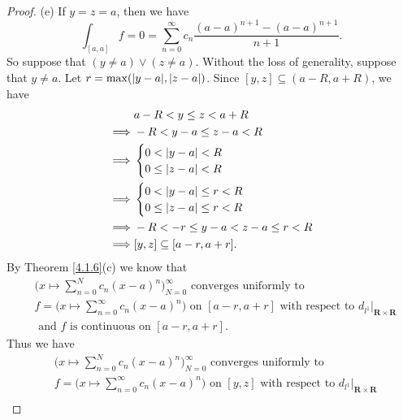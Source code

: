 \begin{proof}{(e)}
    If \(y = z = a\), then we have
    \[
        \int_{[a, a]} f = 0 = \sum_{n = 0}^\infty c_n \frac{(a - a)^{n + 1} - (a - a)^{n + 1}}{n + 1}.
    \]
    So suppose that \((y \neq a) \lor (z \neq a)\).
    Without the loss of generality, suppose that \(y \neq a\).
    Let \(r = \max(\abs*{y - a}, \abs*{z - a})\).
    Since \([y, z] \subseteq (a - R, a + R)\), we have
    \begin{align*}
                 & a - R < y \leq z < a + R              \\
        \implies & -R < y - a \leq z - a < R             \\
        \implies & \begin{cases}
            0 < \abs*{y - a} < R \\
            0 \leq \abs*{z - a} < R
        \end{cases}            \\
        \implies & \begin{cases}
            0 < \abs*{y - a} \leq r < R \\
            0 \leq \abs*{z - a} \leq r < R
        \end{cases}            \\
        \implies & -R < -r \leq y - a < z - a \leq r < R \\
        \implies & [y, z] \subseteq [a - r, a + r].
    \end{align*}
    By Theorem \ref{4.1.6}(c) we know that
    \begin{align*}
         & \bigg(x \mapsto \sum_{n = 0}^N c_n (x - a)^n\bigg)_{N = 0}^\infty \text{ converges uniformly to }                                                       \\
         & f = \bigg(x \mapsto \sum_{n = 0}^\infty c_n (x - a)^n\bigg) \text{ on } [a - r, a + r] \text{ with respect to } d_{l^1}|_{\mathbf{R} \times \mathbf{R}} \\
         & \text{ and } f \text{ is continuous on } [a - r, a + r].
    \end{align*}
    Thus we have
    \begin{align*}
         & \bigg(x \mapsto \sum_{n = 0}^N c_n (x - a)^n\bigg)_{N = 0}^\infty \text{ converges uniformly to }                                               \\
         & f = \bigg(x \mapsto \sum_{n = 0}^\infty c_n (x - a)^n\bigg) \text{ on } [y, z] \text{ with respect to } d_{l^1}|_{\mathbf{R} \times \mathbf{R}} \\

\end{align*}
\end{proof}
